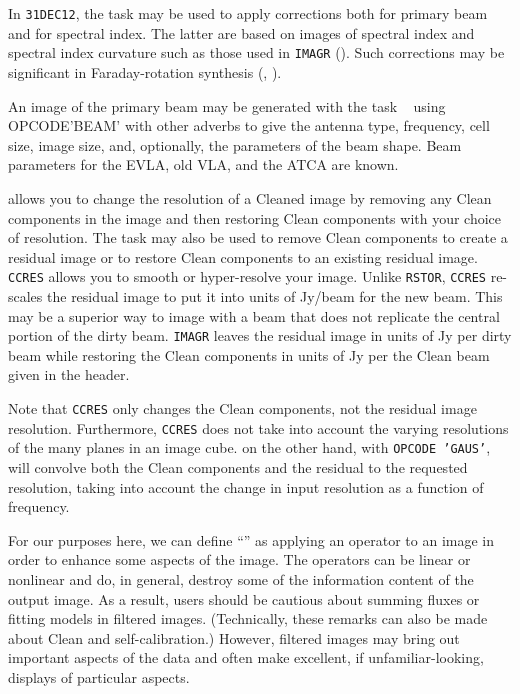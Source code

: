     In {\tt 31DEC12}, the task {\tt {}} may be used to
apply corrections both for primary beam and for spectral index.  The
latter are based on images of spectral index and spectral index
curvature such as those used in {\tt IMAGR} ().  Such
corrections may be significant in Faraday-rotation synthesis
(, ).

     An image of the primary beam may be generated with the task {\tt
{}} using {\us OPCODE\qs 'BEAM' \CR} with other adverbs to
give the antenna type, frequency, cell size, image size, and,
optionally, the parameters of the beam shape.  Beam parameters for the
EVLA, old VLA, and the ATCA are known.

{}

{\tt {}} allows you to change the resolution of a Cleaned
image by removing any Clean components in the image and then restoring
Clean components with your choice of resolution.  The task may also
be used to remove Clean components to create a residual image or to
restore Clean components to an existing residual image.  {\tt CCRES}
allows you to smooth or hyper-resolve your image.  Unlike {\tt RSTOR},
{\tt CCRES} re-scales the residual image to put it into units of
Jy/beam for the new beam.  This may be a superior way to image with a
beam that does not replicate the central portion of the dirty beam.
{\tt IMAGR} leaves the residual image in units of Jy per dirty beam
while restoring the Clean components in units of Jy per the Clean beam
given in the header.

Note that {\tt CCRES} only changes the Clean components, not the
residual image resolution.  Furthermore, {\tt CCRES} does not take
into account the varying resolutions of the many planes in an image
cube.  {\tt {}} on the other hand, with {\tt OPCODE 'GAUS'},
will convolve both the Clean components and the residual to the
requested resolution, taking into account the change in input
resolution as a function of frequency.


     For our purposes here, we can define ``'' as
applying an operator to an image in order to enhance some aspects of
the image.  The operators can be linear or nonlinear and do, in
general, destroy some of the information content of the output image.
As a result, users should be cautious about summing fluxes or fitting
models in filtered images.  (Technically, these remarks can also be
made about Clean and self-calibration.)  However, filtered images may
bring out important aspects of the data and often make excellent, if
unfamiliar-looking, displays of particular aspects.

